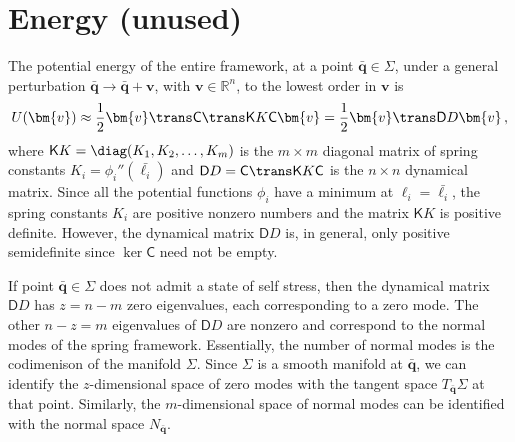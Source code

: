 \section{Energy (unused)}
\label{sec:Energy (unused}


The potential energy of the entire framework, at a point $\bar{\bm{q}} \in \Sigma$, under a general perturbation $\bar{\bm{q}} \to \bar{\bm{q}} + \bm{v}$, with $\bm{v} \in \mathbb{R}^n$, to the lowest order in $\bm{v}$ is
\begin{equation}
  U(\bm{v}) \approx \frac{1}{2}\bm{v}\trans\mathsf{C}\trans\mathsf{K}K\mathsf{C}\bm{v} = \frac{1}{2}\bm{v}\trans\mathsf{D}D\bm{v}\,,\label{eq:energy1}
\end{equation}
where $\mathsf{K}K = \diag(K_1, K_2, \ldots, K_m)$ is the $m\times m$ diagonal matrix of spring constants $K_i = \phi_i''(\bar{\ell_i})$ and $\mathsf{D}D = \mathsf{C}\trans\mathsf{K}K\mathsf{C}$ is the $n\times n$ dynamical matrix.
Since all the potential functions $\phi_i$ have a minimum at $\ell_i = \bar{\ell_i}$, the spring constants $K_i$ are positive nonzero numbers and the matrix $\mathsf{K}K$ is positive definite.
However, the dynamical matrix $\mathsf{D}D$ is, in general, only positive semidefinite since $\ker{\mathsf{C}}$ need not be empty.

If point $\bar{\bm{q}} \in \Sigma$ does not admit a state of self stress, then the dynamical matrix $\mathsf{D}D$ has $z = n - m$ zero eigenvalues, each corresponding to a zero mode.
The other $n - z = m$ eigenvalues of $\mathsf{D}D$ are nonzero and correspond to the normal modes of the spring framework.
Essentially, the number of normal modes is the codimenison of the manifold $\Sigma$.
Since $\Sigma$ is a smooth manifold at $\bar{\bm{q}}$, we can identify the $z$-dimensional space of zero modes with the tangent space $T_{\bar{\bm{q}}}\Sigma$ at that point.
Similarly, the $m$-dimensional space of normal modes can be identified with the normal space $N_{\bar{\bm{q}}}$.

